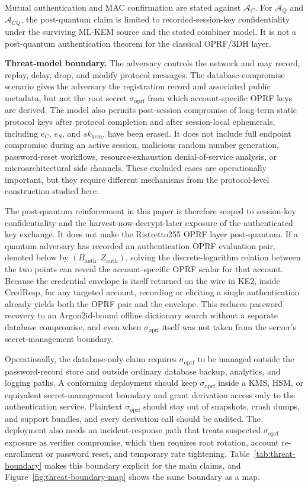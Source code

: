\documentclass{ieeeijc}
\newcommand{\sigoprf}{\sigma_{\mathrm{oprf}}}
\theoremstyle{remark}
\begin{document}
Mutual authentication and MAC confirmation are stated against
$\mathcal{A}_C$. For $\mathcal{A}_Q$ and $\mathcal{A}_{CQ}$, the
post-quantum claim is limited to recorded-session-key confidentiality under
the surviving ML-KEM source and the stated combiner model. It is not a
post-quantum authentication theorem for the classical OPRF/3DH layer.

\textbf{Threat-model boundary.} The adversary controls the network and
may record, replay, delay, drop, and modify protocol messages. The
database-compromise scenario gives the adversary the registration
record and associated public metadata, but not the root secret
$\sigoprf$ from which account-specific OPRF keys are derived. The model
also permits post-session compromise of long-term static protocol keys
after protocol completion and after session-local ephemerals, including
$e_C$, $e_S$, and $sk_{\mathrm{kem}}$, have been erased. It does not include
full endpoint compromise during an active session, malicious random
number generation, password-reset workflows, resource-exhaustion
denial-of-service analysis, or microarchitectural side channels. These
excluded cases are operationally important, but they require different
mechanisms from the protocol-level construction studied here.

The post-quantum reinforcement in this paper is therefore scoped to
session-key confidentiality and the harvest-now-decrypt-later exposure of
the authenticated key exchange. It does not make the Ristretto255 OPRF
layer post-quantum. If a quantum adversary has recorded an authentication
OPRF evaluation pair, denoted below by
$(B_{\mathrm{auth}}, Z_{\mathrm{auth}})$, solving the discrete-logarithm
relation between the two points can reveal the account-specific OPRF scalar
for that account. Because the credential envelope is itself returned on the
wire in KE2, inside $\mathrm{CredResp}$, for any targeted account, recording or
eliciting a single authentication already yields both the OPRF pair and the
envelope. This reduces password recovery to an Argon2id-bound offline dictionary
search without a separate database compromise, and even when $\sigoprf$ itself
was not taken from the server's secret-management boundary.

Operationally, the database-only claim requires $\sigoprf$ to be managed
outside the password-record store and outside ordinary database backup,
analytics, and logging paths. A conforming deployment should keep
$\sigoprf$ inside a KMS, HSM, or equivalent secret-management boundary
and grant derivation access only to the authentication service. Plaintext
$\sigoprf$ should stay out of snapshots, crash dumps, and support bundles,
and every derivation call should be audited. The deployment also needs an
incident-response path that treats suspected $\sigoprf$ exposure as
verifier compromise, which then requires root rotation, account
re-enrollment or password reset, and temporary rate tightening.
Table~\ref{tab:threat-boundary} makes this boundary explicit for the
main claims, and Figure~\ref{fig:threat-boundary-map} shows the same
boundary as a map.
\end{document}
